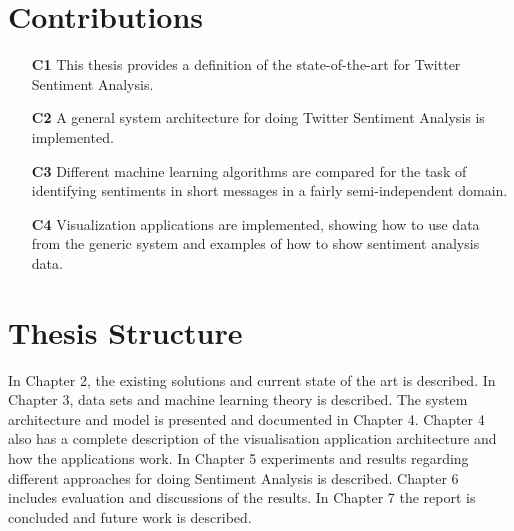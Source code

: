 	

\section{Contributions}
\label{sec:contribution}

\begin{itemize}
\item[\textbf{C1}] This thesis provides a definition of the state-of-the-art for Twitter Sentiment Analysis.

\item[\textbf{C2}] A general system architecture for doing Twitter Sentiment Analysis is implemented. 

\item[\textbf{C3}] Different machine learning algorithms are compared for the task of identifying sentiments in short messages in a fairly semi-independent domain.

\item[\textbf{C4}] Visualization applications are implemented, showing how to use data from the generic system and examples of how to show sentiment analysis data.
 
\end{itemize}

\section{Thesis Structure}
\label{sec:structure}

In Chapter 2, the existing solutions and current state of the art is described. In Chapter 3, data sets and machine learning theory is described. The system architecture and model is presented and documented in Chapter 4. Chapter 4 also has a complete description of the visualisation application architecture and how the applications work. In Chapter 5 experiments and results regarding different approaches for doing Sentiment Analysis is described. Chapter 6 includes evaluation and discussions of the results. In Chapter 7 the report is concluded and future work is described. 




